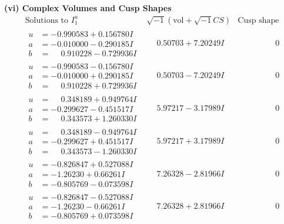 \documentclass[1p]{elsarticle_modified}
\theoremstyle{definition}
\newcommand{\I}{\sqrt{-1}}
\begin{document}
\newpage\flushleft \textbf{(vi) Complex Volumes and Cusp Shapes}
$$\begin{array}{c|c|c}  
\text{Solutions to }I^u_{1}& \I (\text{vol} + \sqrt{-1}CS) & \text{Cusp shape}\\
 \hline 
\begin{aligned}
u &= -0.990583 + 0.156780 I \\
a &= -0.010000 - 0.290185 I \\
b &= \phantom{-}0.910228 - 0.729936 I\end{aligned}
 & \phantom{-}0.50703 + 7.20249 I & \phantom{-0.000000 } 0 \\ \hline\begin{aligned}
u &= -0.990583 - 0.156780 I \\
a &= -0.010000 + 0.290185 I \\
b &= \phantom{-}0.910228 + 0.729936 I\end{aligned}
 & \phantom{-}0.50703 - 7.20249 I & \phantom{-0.000000 } 0 \\ \hline\begin{aligned}
u &= \phantom{-}0.348189 + 0.949764 I \\
a &= -0.299627 - 0.451517 I \\
b &= \phantom{-}0.343573 + 1.260330 I\end{aligned}
 & \phantom{-}5.97217 - 3.17989 I & \phantom{-0.000000 } 0 \\ \hline\begin{aligned}
u &= \phantom{-}0.348189 - 0.949764 I \\
a &= -0.299627 + 0.451517 I \\
b &= \phantom{-}0.343573 - 1.260330 I\end{aligned}
 & \phantom{-}5.97217 + 3.17989 I & \phantom{-0.000000 } 0 \\ \hline\begin{aligned}
u &= -0.826847 + 0.527088 I \\
a &= -1.26230 + 0.66261 I \\
b &= -0.805769 - 0.073598 I\end{aligned}
 & \phantom{-}7.26328 - 2.81966 I & \phantom{-0.000000 } 0 \\ \hline\begin{aligned}
u &= -0.826847 - 0.527088 I \\
a &= -1.26230 - 0.66261 I \\
b &= -0.805769 + 0.073598 I\end{aligned}
 & \phantom{-}7.26328 + 2.81966 I & \phantom{-0.000000 } 0 \\ \hline\begin{aligned}

\end{aligned}
\end{array}$$
\end{document}
